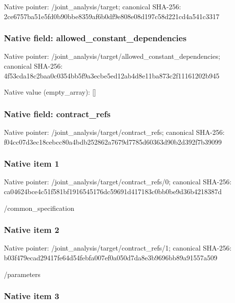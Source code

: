 \documentclass[10pt,a4paper]{article}
\begin{document}
Native pointer: /joint\_analysis/target; canonical SHA-256: 2ce6757ba51e5fd0b90bbe83\allowbreak{}59af6b0df9e808e08d197c58\allowbreak{}d221cd4a541c3317



\subsubsection{Native field: allowed\_constant\_dependencies}


Native pointer: /joint\_analysis/target/a\allowbreak{}llowed\_constant\_dependen\allowbreak{}cies; canonical SHA-256: 4f53cda18c2baa0c0354bb5f\allowbreak{}9a3ecbe5ed12ab4d8e11ba87\allowbreak{}3c2f11161202b945



Native value (empty\_array): []



\subsubsection{Native field: contract\_refs}


Native pointer: /joint\_analysis/target/contract\_refs; canonical SHA-256: f04cc07d3ec18cebcc80a4bd\allowbreak{}b252862a7679d7785d60363d\allowbreak{}90b2d392f7b39099



\subsubsection{Native item 1}


Native pointer: /joint\_analysis/target/contract\_refs/0; canonical SHA-256: ca04624bce4c51f581bf1916\allowbreak{}545176dc59691d417183c0bb\allowbreak{}0be9d36b4218387d


/common\_specification


\subsubsection{Native item 2}


Native pointer: /joint\_analysis/target/contract\_refs/1; canonical SHA-256: b03f479ecad29417fe64d54f\allowbreak{}ebfa007ef0a050d7da8e3b96\allowbreak{}96bb89a91557a509


/parameters


\subsubsection{Native item 3}
\end{document}
